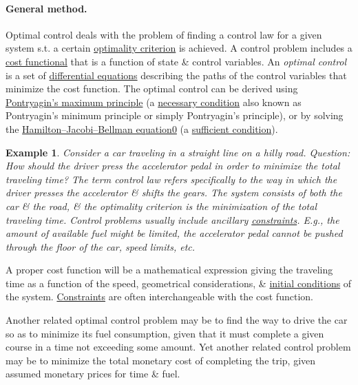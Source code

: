 \documentclass{article}
\newtheorem{example}{Example}
\begin{document}
\paragraph{General method.} Optimal control deals with the problem of finding a control law for a given system s.t. a certain \href{https://en.wikipedia.org/wiki/Optimality_criterion}{optimality criterion} is achieved. A control problem includes a \href{https://en.wikipedia.org/wiki/Cost_functional}{cost functional} that is a function of state \& control variables. An {\it optimal control} is a set of \href{https://en.wikipedia.org/wiki/Differential_equation}{differential equations} describing the paths of the control variables that minimize the cost function. The optimal control can be derived using \href{https://en.wikipedia.org/wiki/Pontryagin%27s_maximum_principle}{Pontryagin's maximum principle} (a \href{https://en.wikipedia.org/wiki/Necessary_condition}{necessary condition} also known as Pontryagin's minimum principle or simply Pontryagin's principle), or by solving the \href{https://en.wikipedia.org/wiki/Hamilton%E2%80%93Jacobi%E2%80%93Bellman_equation}{Hamilton--Jacobi--Bellman equation0} (a \href{https://en.wikipedia.org/wiki/Sufficient_condition}{sufficient condition}).

\begin{example}
	Consider a car traveling in a straight line on a hilly road. Question: How should the driver press the accelerator pedal in order to minimize the total traveling time? The term \emph{control law} refers specifically to the way in which the driver presses the accelerator \& shifts the gears. The \emph{system} consists of both the car \& the road, \& the \emph{optimality criterion} is the minimization of the total traveling time. Control problems usually include ancillary \href{https://en.wikipedia.org/wiki/Constraint_(mathematics)}{constraints}. E.g., the amount of available fuel might be limited, the accelerator pedal cannot be pushed through the floor of the car, speed limits, etc.
\end{example}
A proper cost function will be a mathematical expression giving the traveling time as a function of the speed, geometrical considerations, \& \href{https://en.wikipedia.org/wiki/Initial_condition}{initial conditions} of the system. \href{https://en.wikipedia.org/wiki/Constraint_(mathematics)}{Constraints} are often interchangeable with the cost function.

Another related optimal control problem may be to find the way to drive the car so as to minimize its fuel consumption, given that it must complete a given course in a time not exceeding some amount. Yet another related control problem may be to minimize the total monetary cost of completing the trip, given assumed monetary prices for time \& fuel.
\end{document}
